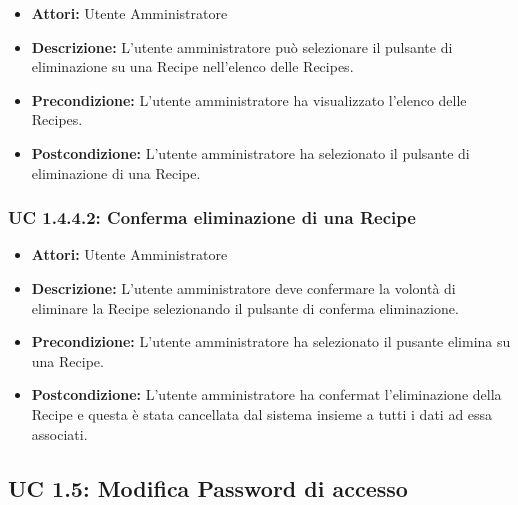 \begin{itemize}
\item \textbf{Attori:} Utente Amministratore
\item \textbf{Descrizione:} L'utente amministratore può selezionare il pulsante di eliminazione su una Recipe nell'elenco delle Recipes.
\item \textbf{Precondizione:} L'utente amministratore ha visualizzato l'elenco delle Recipes.
\item \textbf{Postcondizione:} L'utente amministratore ha selezionato il pulsante di eliminazione di una Recipe. 
\end{itemize}
\subsubsection{UC 1.4.4.2: Conferma eliminazione di una Recipe}

\begin{itemize}
\item \textbf{Attori:} Utente Amministratore
\item \textbf{Descrizione:} L'utente amministratore deve confermare la volontà di eliminare la Recipe selezionando il pulsante di conferma eliminazione.
\item \textbf{Precondizione:} L'utente amministratore ha selezionato il pusante elimina su una Recipe.
\item \textbf{Postcondizione:} L'utente amministratore ha confermat l'eliminazione della Recipe e questa è stata cancellata dal sistema insieme a tutti i dati ad essa associati.
\end{itemize}



\subsection{UC 1.5: Modifica Password di accesso}


